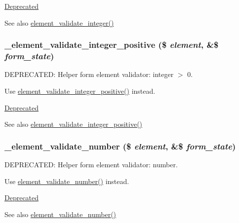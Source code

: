 \begin{Desc}
\item[\hyperlink{deprecated__deprecated000001}{Deprecated}]\end{Desc}
\begin{DoxySeeAlso}{See also}
\hyperlink{group__form__api_ga6fffa62178c1fc94329e142b083e9b1c}{element\_\-validate\_\-integer()} 
\end{DoxySeeAlso}
\hypertarget{field_8module_a8a204417f7ec4289d828b223afa22c57}{
\subsubsection[{\_\-element\_\-validate\_\-integer\_\-positive}]{\setlength{\rightskip}{0pt plus 5cm}\_\-element\_\-validate\_\-integer\_\-positive (\$ {\em element}, \/  \&\$ {\em form\_\-state})}}
\label{field_8module_a8a204417f7ec4289d828b223afa22c57}
DEPRECATED: Helper form element validator: integer $>$ 0.

Use \hyperlink{group__form__api_gad8feb4fd6d8404783042cde1146f53cf}{element\_\-validate\_\-integer\_\-positive()} instead.

\begin{Desc}
\item[\hyperlink{deprecated__deprecated000002}{Deprecated}]\end{Desc}
\begin{DoxySeeAlso}{See also}
\hyperlink{group__form__api_gad8feb4fd6d8404783042cde1146f53cf}{element\_\-validate\_\-integer\_\-positive()} 
\end{DoxySeeAlso}
\hypertarget{field_8module_a95595f737604fea8bffc695d064f2b67}{
\subsubsection[{\_\-element\_\-validate\_\-number}]{\setlength{\rightskip}{0pt plus 5cm}\_\-element\_\-validate\_\-number (\$ {\em element}, \/  \&\$ {\em form\_\-state})}}
\label{field_8module_a95595f737604fea8bffc695d064f2b67}
DEPRECATED: Helper form element validator: number.

Use \hyperlink{group__form__api_ga64f40a7bf432284ba5b15021445abd86}{element\_\-validate\_\-number()} instead.

\begin{Desc}
\item[\hyperlink{deprecated__deprecated000003}{Deprecated}]\end{Desc}
\begin{DoxySeeAlso}{See also}
\hyperlink{group__form__api_ga64f40a7bf432284ba5b15021445abd86}{element\_\-validate\_\-number()} 
\end{DoxySeeAlso}
